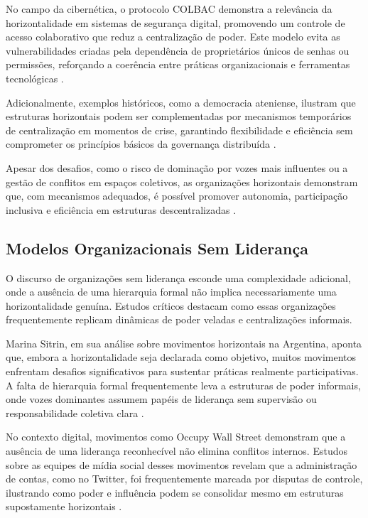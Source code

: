 No campo da cibernética, o protocolo COLBAC demonstra a relevância da
horizontalidade em sistemas de segurança digital, promovendo um controle de
acesso colaborativo que reduz a centralização de poder. Este modelo evita
as vulnerabilidades criadas pela dependência de proprietários únicos de
senhas ou permissões, reforçando a coerência entre práticas organizacionais
e ferramentas tecnológicas \cite{Colbac}.

Adicionalmente, exemplos históricos, como a democracia ateniense, ilustram
que estruturas horizontais podem ser complementadas por mecanismos
temporários de centralização em momentos de crise, garantindo flexibilidade
e eficiência sem comprometer os princípios básicos da governança
distribuída \cite{AthenianDemocracyABrief}.

Apesar dos desafios, como o risco de dominação por vozes mais influentes ou
a gestão de conflitos em espaços coletivos, as organizações horizontais
demonstram que, com mecanismos adequados, é possível promover autonomia,
participação inclusiva e eficiência em estruturas descentralizadas
\cite{SocialMediaTeamsAsDigitalVanguards}.

\subsection{Modelos Organizacionais Sem Liderança}
\label{sec:modelos_sem_lideranca}

O discurso de organizações sem liderança esconde uma complexidade
adicional, onde a ausência de uma hierarquia formal não implica
necessariamente uma horizontalidade genuína. Estudos críticos destacam como
essas organizações frequentemente replicam dinâmicas de poder veladas e
centralizações informais.

Marina Sitrin, em sua análise sobre movimentos horizontais na Argentina,
aponta que, embora a horizontalidade seja declarada como objetivo, muitos
movimentos enfrentam desafios significativos para sustentar práticas
realmente participativas. A falta de hierarquia formal frequentemente leva
a estruturas de poder informais, onde vozes dominantes assumem papéis de
liderança sem supervisão ou responsabilidade coletiva clara
\cite{EverydayRevolutions}.

No contexto digital, movimentos como Occupy Wall Street demonstram que a
ausência de uma liderança reconhecível não elimina conflitos internos.
Estudos sobre as equipes de mídia social desses movimentos revelam que a
administração de contas, como no Twitter, foi frequentemente marcada por
disputas de controle, ilustrando como poder e influência podem se
consolidar mesmo em estruturas supostamente horizontais
\cite{SocialMediaTeamsAsDigitalVanguards}.

